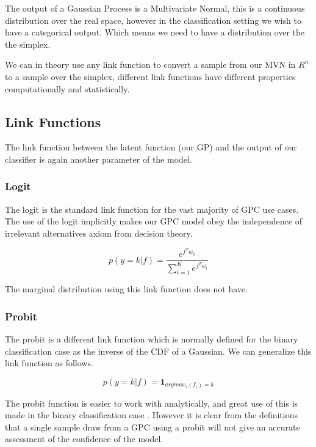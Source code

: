 \documentclass[12pt, a4paper]{report}
\theoremstyle{definition}
\theoremstyle{definition}
\theoremstyle{definition}
\begin{document}
The output of a Gaussian Process is a Multivariate Normal, this is a continuous distribution over the real space, however in the classification setting we wish to have a categorical output. Which means we need to have a distribution over the the simplex.

We can in theory use any link function to convert a sample from our MVN in $R^n$ to a sample over the simplex, different link functions have different properties computationally and statistically.

\subsection{Link Functions}

The link function between the latent function (our GP) and the output of our classifier is again another parameter of the model.

\subsubsection{Logit}

The logit is the standard link function for the vast majority of GPC use cases. The use of the logit implicitly makes our GPC model obey the independence of irrelevant alternatives axiom from decision theory. 


$$p\left( y = k | f\right) = \frac{e^{f^T w_k}}{\sum_{i=1}^{K} e^{f^T w_i}}$$


The marginal distribution using this link function does not have.


\subsubsection{Probit}

The probit is a different link function which is normally defined for the binary classification case as the inverse of the CDF of a Gaussian. We can generalize this link function as follows.

$$p\left(y = k | f\right) = \mathbf{1}_{argmax_i(f_i) = k}$$


The probit function is easier to work with analytically, and great use of this is made in the binary classification case \cite{houlsby2011bayesian}. However it is clear from the definitions that a single sample draw from a GPC using a probit will not give an accurate assessment of the confidence of the model.


\label{sec:Integration}
\end{document}
